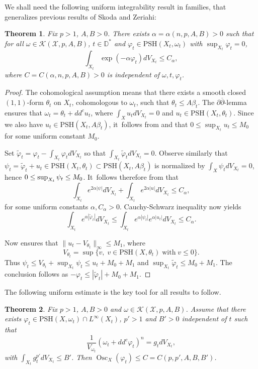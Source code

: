 \documentclass[10pt]{amsart}
\DeclareMathOperator{\Osc}{Osc}
\newtheorem{theorem}{Theorem}[section]
\theoremstyle{definition}
\newcommand{\D}{\mathbb D}
\let\f\varphi
\let\p\psi
\newcommand \PSH {\mathrm{PSH}}
\begin{document}
We shall need the following uniform integrability result in families, that
generalizes previous results of Skoda and Zeriahi:

\begin{theorem} \label{thm:sz}
Fix $p>1$, $A,B>0$. There exists $\alpha=\alpha(n,p,A,B)>0$ such that for all
$\omega \in {\mathcal K}(\mathcal{X},p,A,B)$, $t \in \D^*$ and
$\f_t \in \PSH(X_t,\omega_t)$ with $\sup_{X_t} \f_t=0$,
\[
\int_{X_t} \exp(-\alpha \f_t) dV_{X_t} \leq C_{\alpha},
\]
where $C=C(\alpha,n,p,A,B)>0$ is independent of $\omega,t,\f_t$.
\end{theorem}

\begin{proof}
The cohomological assumption means that there exists a smooth closed $(1,1)$-form $\theta_t$ on $X_t$,
cohomologous to $\omega_t$, such that $\theta_t \leq A\beta_t$.
The $\partial\overline{\partial}$-lemma ensures that $\omega_t=\theta_t+dd^c u_t$, where
$\int _X u_t dV_{X_t} =0$ and $u_t \in \PSH(X_t,\theta_t)$.
Since we also have $u_t \in \PSH(X_t, A \beta_t)$, it~follows from \cite[Conj.\,3.1]{DnGG23} and \cite[Cor.\,4.8]{Ou22}
that $0 \leq \sup_{X_t} u_t \leq M_0$ for some uniform constant $M_0$.

Set $\tilde{\f}_t=\f_t-\int_{X_t} \f_t dV_{X_t}$ so that $\int_{X_t} \tilde{\f}_t dV_{X_t}=0$.
Observe similarly that $ \psi_t=\tilde{\f}_t+u_t \in \PSH(X_t, \theta_t) \subset\PSH(X_t, A \beta_t)$
is normalized by $\int_{X} \psi_t dV_{X_t}=0$,
hence $0 \leq\nobreak \sup_{X_t} \psi_t \leq M_0$. It~follows therefore from \cite[Th.\,2.9]{DnGG23} that
\[
\int_{X_t} e^{2\alpha|\psi|}dV_{X_t} + \int_{X_t} e^{2\alpha| u |}dV_{X_t} \leq C_\alpha,
\]
for some uniform constants $\alpha,C_\alpha>0$.
Cauchy-Schwarz inequality now yields
\[
\int_{X_t} e^{\alpha |\tilde{\f}_t| } dV_{X_t}
\leq \int_{X_t} e^{\alpha |\psi_t| } e^{\alpha |u_t| } dV_{X_t}
\leq C_\alpha.
\]

Now \cite[Th.\,1.9]{DnGG23} ensures that $\|u_t-V_{\theta_t}\|_{\infty} \leq M_1$,
where
\[
V_{\theta_t}=\sup \{v, \; v \in\PSH(X,\theta_t) \; \text{with} \; v \leq 0 \}.
\]
Thus $\p_t \leq V_{\theta_t}+\sup_{X_t} \p_t \leq u_t+M_0+M_1$ and $\sup_{X_t} \tilde{\f}_t \leq M_0+M_1$.
The conclusion follows as $-\f_t \leq |\tilde{\f}_t|+M_0+M_1$.
\end{proof}

The following uniform estimate is the key tool for all results to follow.

\begin{theorem} \label{thm:uniformMA}
Fix $p>1$, $A,B>0$ and $\omega \in {\mathcal K}(\mathcal{X},p,A,B)$.
Assume that there exists $\f_t \in\PSH(X,\omega_t) \cap L^{\infty}(X_t)$,
$p'>1$ and $B'>0$ independent of $t$ such that
\[
\frac{1}{V_{\omega_t}}(\omega_t+dd^c \f_t)^n=g_t dV_{X_t},
\]
with $\int_{X_t} g_t^{p'} dV_{X_t} \leq B'$.
Then $\Osc_X(\f_t) \leq C=C(p,p',A,B,B')$.
\end{theorem}
\end{document}
